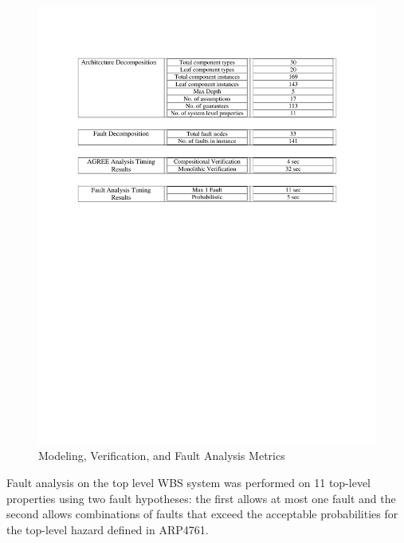 \begin{figure}[h!]
	\vspace{-0.17in}
	\begin{center}
		\includegraphics[trim=0 435 0 90,clip,width=1.0\textwidth]{images/arch_table.pdf}
		\caption{Modeling, Verification, and Fault Analysis Metrics}
 		\label{fig:metrics}
	\end{center}
	\vspace{-0.40in}
\end{figure}
\fi 


Fault analysis on the top level WBS system was performed on 11 top-level properties using two fault hypotheses: the first allows at most one fault and the second allows combinations of faults that exceed the acceptable probabilities for the top-level hazard defined in ARP4761.

